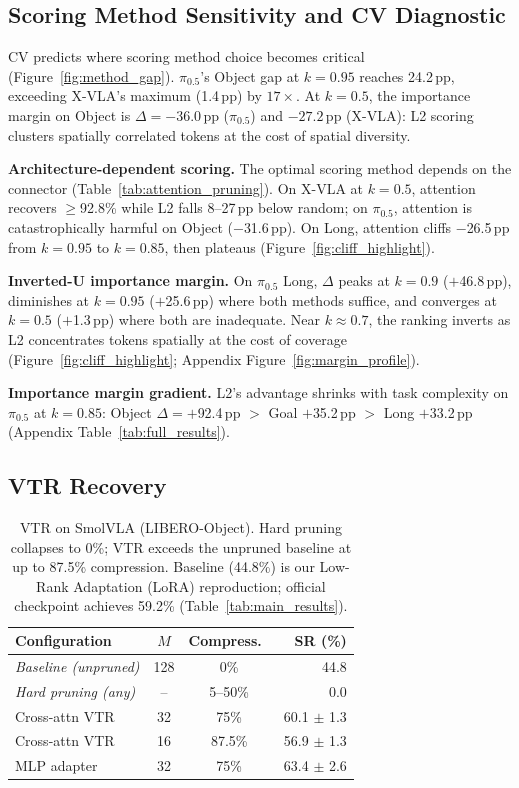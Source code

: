 \subsection{Scoring Method Sensitivity and CV Diagnostic}
\label{sec:cv_sensitivity}

CV predicts where scoring method choice becomes critical (Figure~\ref{fig:method_gap}). $\pi_{0.5}$'s Object gap at $k{=}0.95$ reaches 24.2\,pp, exceeding X-VLA's maximum (1.4\,pp) by $17{\times}$. At $k{=}0.5$, the importance margin on Object is $\Delta{=}{-}36.0$\,pp ($\pi_{0.5}$) and ${-}27.2$\,pp (X-VLA): L2 scoring clusters spatially correlated tokens at the cost of spatial diversity.

\textbf{Architecture-dependent scoring.} The optimal scoring method depends on the connector (Table~\ref{tab:attention_pruning}). On X-VLA at $k{=}0.5$, attention recovers ${\geq}$92.8\% while L2 falls 8--27\,pp below random; on $\pi_{0.5}$, attention is catastrophically harmful on Object ($-$31.6\,pp). On Long, attention cliffs $-$26.5\,pp from $k{=}0.95$ to $k{=}0.85$, then plateaus (Figure~\ref{fig:cliff_highlight}).

\textbf{Inverted-U importance margin.} On $\pi_{0.5}$ Long, $\Delta$ peaks at $k{=}0.9$ ($+$46.8\,pp), diminishes at $k{=}0.95$ ($+$25.6\,pp) where both methods suffice, and converges at $k{=}0.5$ ($+$1.3\,pp) where both are inadequate. Near $k{\approx}0.7$, the ranking inverts as L2 concentrates tokens spatially at the cost of coverage (Figure~\ref{fig:cliff_highlight}; Appendix Figure~\ref{fig:margin_profile}).

\textbf{Importance margin gradient.} L2's advantage shrinks with task complexity on $\pi_{0.5}$ at $k{=}0.85$: Object $\Delta{=}+$92.4\,pp $>$ Goal $+$35.2\,pp $>$ Long $+$33.2\,pp (Appendix Table~\ref{tab:full_results}).

\subsection{VTR Recovery}
\label{sec:vtr_recovery}

\begin{table}[t]
\centering
\small
\caption{VTR on SmolVLA (LIBERO-Object). Hard pruning collapses to 0\%; VTR exceeds the unpruned baseline at up to 87.5\% compression. Baseline (44.8\%) is our Low-Rank Adaptation (LoRA) reproduction; official checkpoint achieves 59.2\% (Table~\ref{tab:main_results}).}
\label{tab:vtr_main}
\begin{tabular}{lccr}
\toprule
Configuration & $M$ & Compress.\ & SR (\%) \\
\midrule
\textit{Baseline (unpruned)} & 128 & 0\% & 44.8 \\
\textit{Hard pruning (any)} & -- & 5--50\% & 0.0 \\
\midrule
Cross-attn VTR & 32 & 75\% & 60.1 $\pm$ 1.3 \\
Cross-attn VTR & 16 & 87.5\% & 56.9 $\pm$ 1.3 \\
MLP adapter & 32 & 75\% & 63.4 $\pm$ 2.6 \\
\bottomrule
\end{tabular}
\end{table}

